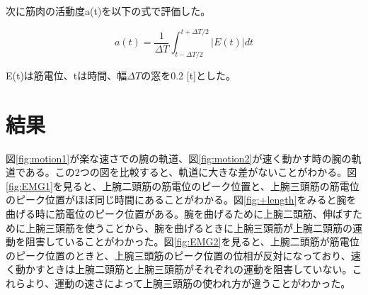 \documentclass{jsarticle}
\begin{document}
次に筋肉の活動度a(t)を以下の式で評価した。

\begin{equation}
a(t)=\frac{1}{\Delta{T}}\int^{t+\Delta{T}/2}_{t-\Delta{T}/2} |E(t)|dt
\end{equation}

E(t)は筋電位、tは時間、幅$\Delta{T}$の窓を0.2 [t]とした。

\section{結果}

図\ref{fig:motion1}が楽な速さでの腕の軌道、図\ref{fig:motion2}が速く動かす時の腕の軌道である。この2つの図を比較すると、軌道に大きな差がないことがわかる。図\ref{fig:EMG1}を見ると、上腕二頭筋の筋電位のピーク位置と、上腕三頭筋の筋電位のピーク位置がほぼ同じ時間にあることがわかる。図\ref{fig:+length}をみると腕を曲げる時に筋電位のピーク位置がある。腕を曲げるために上腕二頭筋、伸ばすために上腕三頭筋を使うことから、腕を曲げるときに上腕三頭筋が上腕二頭筋の運動を阻害していることがわかった。図\ref{fig:EMG2}を見ると、上腕二頭筋が筋電位のピーク位置のときと、上腕三頭筋のピーク位置の位相が反対になっており、速く動かすときは上腕二頭筋と上腕三頭筋がそれぞれの運動を阻害していない。これらより、運動の速さによって上腕三頭筋の使われ方が違うことがわかった。
\end{document}
